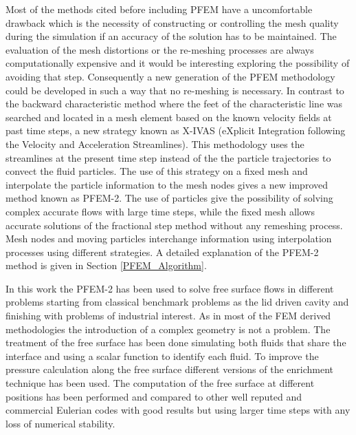 Most of the methods cited before including PFEM have a uncomfortable drawback which is the necessity of constructing or controlling the mesh quality during the simulation if an accuracy of the solution has to be maintained. The evaluation of the mesh distortions or the re-meshing processes are always computationally expensive and it would be interesting exploring the possibility of avoiding that step. Consequently a new generation of the PFEM methodology could be developed in such a way that no re-meshing is necessary.
In contrast to the backward characteristic method where the feet of the characteristic line was searched and located in a mesh element based on the known velocity fields at past time steps, a new strategy known as X-IVAS (eXplicit Integration following the Velocity and Acceleration Streamlines)\cite{Idelsohn12}. This methodology uses the streamlines at the present time step instead of the the particle trajectories to convect the fluid particles. The use of this strategy on a fixed mesh and interpolate the particle information to the mesh nodes gives a new improved method known as PFEM-2\cite{Idelsohn12b}. The use of particles give the possibility of solving complex accurate flows with large time steps, while the fixed mesh allows accurate solutions of the fractional step method without any remeshing process. Mesh nodes and moving particles interchange information using interpolation processes using different strategies. A detailed explanation of the PFEM-2 method is given in Section \ref{PFEM_Algorithm}.

In this work the PFEM-2 has been used to solve free surface flows in different problems starting from classical benchmark problems as the lid driven cavity and finishing with problems of industrial interest. As in most of the FEM derived methodologies the introduction of a complex geometry is not a problem. The treatment of the free surface has been done simulating both fluids that share the interface and using a scalar function to identify each fluid. To improve the pressure calculation along the free surface different versions of the enrichment technique \cite{Coppola} has been used. The computation of the free surface at different positions has been performed and compared to other well reputed and commercial Eulerian codes with good results but using larger time steps with any loss of numerical stability. 